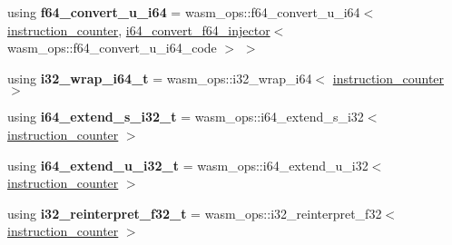 \begin{DoxyCompactItemize}
using {\bfseries f64\+\_\+convert\+\_\+u\+\_\+i64} = wasm\+\_\+ops\+::f64\+\_\+convert\+\_\+u\+\_\+i64$<$ \mbox{\hyperlink{structaacio_1_1chain_1_1wasm__injections_1_1instruction__counter}{instruction\+\_\+counter}}, \mbox{\hyperlink{structaacio_1_1chain_1_1wasm__injections_1_1i64__convert__f64__injector}{i64\+\_\+convert\+\_\+f64\+\_\+injector}}$<$ wasm\+\_\+ops\+::f64\+\_\+convert\+\_\+u\+\_\+i64\+\_\+code $>$ $>$
\item 
\mbox{\label{structaacio_1_1chain_1_1wasm__injections_1_1pre__op__injectors_ab58a8fb702f495d2cf5b9036ee6c30d0}} 
using {\bfseries i32\+\_\+wrap\+\_\+i64\+\_\+t} = wasm\+\_\+ops\+::i32\+\_\+wrap\+\_\+i64$<$ \mbox{\hyperlink{structaacio_1_1chain_1_1wasm__injections_1_1instruction__counter}{instruction\+\_\+counter}} $>$
\item 
\mbox{\label{structaacio_1_1chain_1_1wasm__injections_1_1pre__op__injectors_a3b6742369a8a6bb0d115322ad49435ae}} 
using {\bfseries i64\+\_\+extend\+\_\+s\+\_\+i32\+\_\+t} = wasm\+\_\+ops\+::i64\+\_\+extend\+\_\+s\+\_\+i32$<$ \mbox{\hyperlink{structaacio_1_1chain_1_1wasm__injections_1_1instruction__counter}{instruction\+\_\+counter}} $>$
\item 
\mbox{\label{structaacio_1_1chain_1_1wasm__injections_1_1pre__op__injectors_a8eb0bb9156ca57fc0293781fc32d697b}} 
using {\bfseries i64\+\_\+extend\+\_\+u\+\_\+i32\+\_\+t} = wasm\+\_\+ops\+::i64\+\_\+extend\+\_\+u\+\_\+i32$<$ \mbox{\hyperlink{structaacio_1_1chain_1_1wasm__injections_1_1instruction__counter}{instruction\+\_\+counter}} $>$
\item 
\mbox{\label{structaacio_1_1chain_1_1wasm__injections_1_1pre__op__injectors_a8f1dec299a8eca73694aa46f711b042e}} 
using {\bfseries i32\+\_\+reinterpret\+\_\+f32\+\_\+t} = wasm\+\_\+ops\+::i32\+\_\+reinterpret\+\_\+f32$<$ \mbox{\hyperlink{structaacio_1_1chain_1_1wasm__injections_1_1instruction__counter}{instruction\+\_\+counter}} $>$
\item 
\mbox{\label{structaacio_1_1chain_1_1wasm__injections_1_1pre__op__injectors_a17fed32500348b302acb6c6dd496f85c}} 

\end{DoxyCompactItemize}
